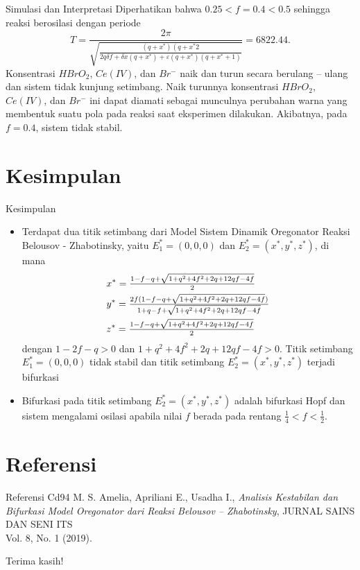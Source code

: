 \documentclass[aspectratio=169]{beamer}
\begin{document}
\begin{frame}{Simulasi dan Interpretasi}
    Diperhatikan bahwa $0.25 < f = 0.4 < 0.5$ sehingga reaksi berosilasi dengan periode 
    $$T=\frac{2 \pi}{\sqrt{\frac{\left(q+x^*\right)\left(q+x^* 2\right.}{2 q \delta f+\delta x\left(q+x^*\right)+\varepsilon\left(q+x^*\right)\left(q+x^*+1\right)}}} = 6822.44.$$
    Konsentrasi $HBrO_2$, $Ce(IV)$, dan $Br^{-}$ naik dan turun secara berulang – ulang dan sistem tidak kunjung setimbang. Naik turunnya konsentrasi $HBrO_2$, $Ce(IV)$, dan $Br^{-}$ ini dapat diamati sebagai munculnya perubahan warna yang membentuk suatu pola pada reaksi saat eksperimen dilakukan. Akibatnya, pada $f = 0.4$, sistem tidak stabil.
\end{frame}

\section{Kesimpulan}
\begin{frame}{Kesimpulan}
    \begin{itemize}
    \item [1.] Terdapat dua titik setimbang dari Model Sistem Dinamik Oregonator Reaksi Belousov - Zhabotinsky, yaitu $E_1^*=(0,0,0)$ dan $E_2^*=(x^*,y^*,z^*)$, di mana 
        \begin{align}
        & x^* = \tfrac{1-f-q+\sqrt{1+q^2+4f^2+2q+12qf-4f}}{2}  \notag \\
        & y^* = \tfrac{2f(1-f-q+\sqrt{1+q^2+4f^2+2q+12qf-4f})}{1+q-f+\sqrt{1+q^2+4f^2+2q+12qf-4f}}  \notag \\
        & z^* = \tfrac{1-f-q+\sqrt{1+q^2+4f^2+2q+12qf-4f}}{2} \notag
        \end{align}
    dengan $1-2f-q>0$ dan $1+q^2+4f^2+2q+12qf-4f>0$.
     Titik setimbang $E_1^*=(0,0,0)$ tidak stabil dan titik setimbang $E_2^*=(x^*,y^*,z^*)$ terjadi bifurkasi
     \item [2.] Bifurkasi pada titik setimbang $E_2^*=(x^*,y^*,z^*)$ adalah bifurkasi Hopf dan sistem mengalami osilasi apabila nilai $f$ berada pada rentang $\tfrac{1}{4} < f < \tfrac{1}{2}$.
     \end{itemize}
\end{frame}

\section{Referensi}

\begin{frame}{Referensi}
    {Cd94} \hspace{0.5cm} M. S. Amelia, Apriliani E., Usadha I., \emph{Analisis Kestabilan dan Bifurkasi Model Oregonator dari Reaksi Belousov – Zhabotinsky}, JURNAL SAINS DAN SENI ITS \\ Vol. 8, No. 1 (2019).
\end{frame}

\begin{frame}
    \begin{center}
        {\Huge\calligra Terima kasih!}
    \end{center}
\end{frame}
\end{document}
